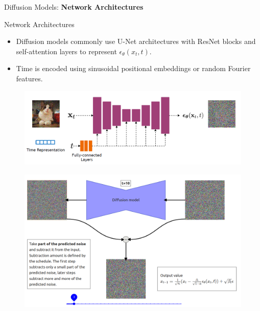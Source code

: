 \begin{frame}{}
    \LARGE Diffusion Models: \textbf{Network Architectures}
\end{frame}

\begin{frame}[allowframebreaks]{Network Architectures}
\begin{itemize}
    \item Diffusion models commonly use U-Net architectures with ResNet blocks and self-attention layers to represent $\epsilon_\theta(x_t, t)$.
    \item Time is encoded using sinusoidal positional embeddings or random Fourier features.
\end{itemize}
\begin{figure}
    \centering
    \includegraphics[height=0.7\textheight, width=\textwidth, keepaspectratio]{images/diffusion/diff_7.png}
\end{figure}

\framebreak
\begin{figure}
    \centering
    \includegraphics[height=0.9\textheight, width=\textwidth, keepaspectratio]{images/diffusion/architecture-network.png}
\end{figure}


\end{frame}
